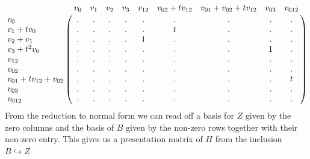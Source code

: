 \begin{example}


    \[
\bordermatrix{
    & v_{0} & v_{1} & v_{2} & v_{3} & v_{12} & v_{02}+tv_{12} & v_{01}+v_{02}+tv_{12} & v_{03} & v_{012}\cr
    v_{0}  &.&.&.&.&.&.&.&.&.\cr
    v_{1}+tv_{0}  &.&.&.&.&.&t&.&.&.\cr
    v_{2}+v_{1}  &.&.&.&.&1&.&.&.&.\cr
    v_{3}+t^{2}v_{0}  &.&.&.&.&.&.&.&1&.\cr
    v_{12} &.&.&.&.&.&.&.&.&.\cr
    v_{02} &.&.&.&.&.&.&.&.&.\cr
    v_{01}+tv_{12}+v_{02} &.&.&.&.&.&.&.&.&t\cr
    v_{03} &.&.&.&.&.&.&.&.&.\cr
    v_{012}&.&.&.&.&.&.&.&.&.
    }
  \]
  From the reduction to normal form we can read off a basis for $Z$ given by the zero columns and the basis of $B$ given by the non-zero rows together with their non-zero entry. This gives us a presentation matrix of $H$ from the inclusion $B \hookrightarrow Z$


\end{example}
